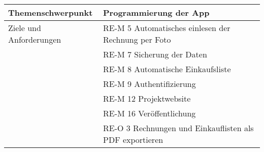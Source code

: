 \begin{longtable}[]{@{}ll@{}}
\toprule
\begin{minipage}[b]{0.31\columnwidth}\raggedright
Themenschwerpunkt\strut
\end{minipage} & \begin{minipage}[b]{0.63\columnwidth}\raggedright
Programmierung der App\strut
\end{minipage}\tabularnewline
\midrule
\endhead
\begin{minipage}[t]{0.31\columnwidth}\raggedright
Ziele und Anforderungen\strut
\end{minipage} & \begin{minipage}[t]{0.63\columnwidth}\raggedright
RE-M 5 Automatisches einlesen der Rechnung per Foto\strut
\end{minipage}\tabularnewline
\begin{minipage}[t]{0.31\columnwidth}\raggedright
\strut
\end{minipage} & \begin{minipage}[t]{0.63\columnwidth}\raggedright
RE-M 7 Sicherung der Daten\strut
\end{minipage}\tabularnewline
\begin{minipage}[t]{0.31\columnwidth}\raggedright
\strut
\end{minipage} & \begin{minipage}[t]{0.63\columnwidth}\raggedright
RE-M 8 Automatische Einkaufsliste\strut
\end{minipage}\tabularnewline
\begin{minipage}[t]{0.31\columnwidth}\raggedright
\strut
\end{minipage} & \begin{minipage}[t]{0.63\columnwidth}\raggedright
RE-M 9 Authentifizierung\strut
\end{minipage}\tabularnewline
\begin{minipage}[t]{0.31\columnwidth}\raggedright
\strut
\end{minipage} & \begin{minipage}[t]{0.63\columnwidth}\raggedright
RE-M 12 Projektwebsite\strut
\end{minipage}\tabularnewline
\begin{minipage}[t]{0.31\columnwidth}\raggedright
\strut
\end{minipage} & \begin{minipage}[t]{0.63\columnwidth}\raggedright
RE-M 16 Veröffentlichung\strut
\end{minipage}\tabularnewline
\begin{minipage}[t]{0.31\columnwidth}\raggedright
\strut
\end{minipage} & \begin{minipage}[t]{0.63\columnwidth}\raggedright
RE-O 3 Rechnungen und Einkauflisten als PDF exportieren\strut
\end{minipage}\tabularnewline
\bottomrule
\end{longtable}

